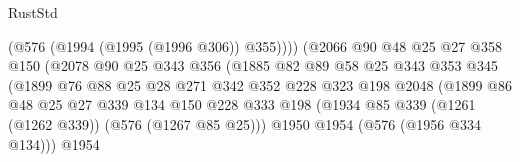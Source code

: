 \begin{lexlean}{RustStd}
\begin{coremodule}
                                        (@576 (@1994 (@1995 (@1996 @306)) @355))))
                                    (@2066
                                      @90
                                      @48
                                      @25
                                      @27
                                      @358
                                      @150
                                      (@2078
                                        @90
                                        @25
                                        @343
                                        @356
                                        (@1885
                                          @82
                                          @89
                                          @58
                                          @25
                                          @343
                                          @353
                                          @345
                                          (@1899
                                            @76
                                            @88
                                            @25
                                            @28
                                            @271
                                            @342
                                            @352
                                            @228
                                            @323
                                            @198
                                            @2048
                                            (@1899
                                              @86
                                              @48
                                              @25
                                              @27
                                              @339
                                              @134
                                              @150
                                              @228
                                              @333
                                              @198
                                              (@1934
                                                @85
                                                @339
                                                (@1261 (@1262 @339))
                                                (@576 (@1267 @85 @25)))
                                              @1950
                                              @1954
                                              (@576 (@1956 @334 @134)))
                                            @1954

\end{coremodule}
\end{lexlean}
